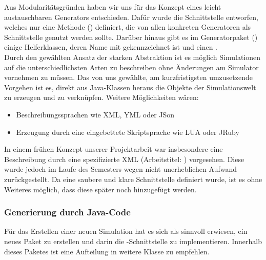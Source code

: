 Aus Modularitätsgründen haben wir uns für das Konzept eines leicht austauschbaren Generators entschieden. Dafür wurde die Schnittstelle  entworfen, welches nur eine Methode () definiert, die von allen konkreten Generatoren als Schnittstelle genutzt werden sollte.
Darüber hinaus gibt es im Generatorpaket () einige Helferklassen, deren Name mit  gekennzeichnet ist und einen .\\

Durch den gewählten Ansatz der starken Abstraktion ist es möglich Simulationen auf die unterschiedlichsten Arten zu beschreiben ohne Änderungen am Simulator vornehmen zu müssen. Das von uns gewählte, am kurzfristigsten umzusetzende Vorgehen ist es, direkt aus Java-Klassen heraus die Objekte der Simulationswelt zu erzeugen und zu verknüpfen. Weitere Möglichkeiten wären:
\begin{itemize}
  \item{Beschreibungssprachen wie XML, YML oder JSon}
  \item{Erzeugung durch eine eingebettete Skriptsprache wie LUA oder JRuby}
\end{itemize}
In einem frühen Konzept unserer Projektarbeit war insbesondere eine Beschreibung durch eine spezifizierte XML (Arbeitstitel: ) vorgesehen. Diese wurde jedoch im Laufe des Semesters wegen nicht unerheblichen Aufwand zurückgestellt. Da eine saubere und klare Schnittstelle definiert wurde, ist es ohne Weiteres möglich, dass diese später noch hinzugefügt werden.

\subsubsection{Generierung durch Java-Code}\label{subsec:real_generator_java}
Für das Erstellen einer neuen Simulation hat es sich als sinnvoll erwiesen, ein neues Paket zu erstellen und darin die -Schnittstelle zu implementieren. Innerhalb dieses Paketes ist eine Aufteilung in weitere Klasse zu empfehlen.

